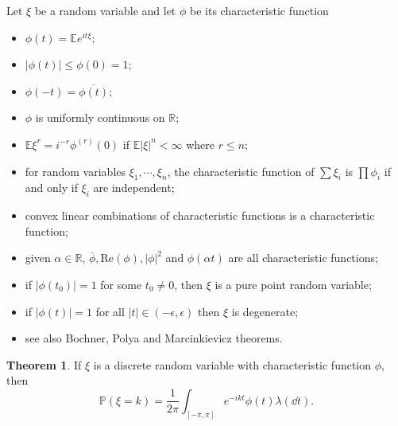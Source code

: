 \documentclass[]{article}
\theoremstyle{definition}
\newtheorem*{theorem}{Theorem}
\begin{document}
Let \(\xi\) be a random variable and let \(\phi\) be its characteristic function
\begin{itemize}
  \item \(\phi(t) =\mathbb{E}e^{it\xi}\);
  \item \(|\phi(t)| \le \phi(0) = 1\);
  \item \(\phi(-t) = \overline{\phi(t)}\);
  \item \(\phi\) is uniformly continuous on \(\mathbb{R}\);
  \item \(\mathbb{E}\xi^r = i^{-r}\phi^{(r)}(0)\) if \(\mathbb{E}|\xi|^n < \infty\) where \(r \le n\);
  \item for random variables \(\xi_1, \cdots, \xi_n\), the characteristic function of 
    \(\sum \xi_i\) is \(\prod \phi_i\) if and only if \(\xi_i\) are independent;
  \item convex linear combinations of characteristic functions is a characteristic function;
  \item given \(\alpha \in \mathbb{R}\), \(\overline{\phi}, \text{Re}(\phi), |\phi|^2\) and \(\phi(\alpha t)\) are all characteristic functions;
  \item if \(|\phi(t_0)| = 1\) for some \(t_0 \neq 0\), then \(\xi\) is a pure point random variable;
  \item if \(|\phi(t)| = 1\) for all \(|t| \in (-\epsilon, \epsilon)\) then \(\xi\) is degenerate;
  \item see also Bochner, Polya and Marcinkievicz theorems.
\end{itemize}

\begin{theorem}
  If \(\xi\) is a discrete random variable with characteristic function \(\phi\), then 
  \[\mathbb{P}(\xi = k) = \frac{1}{2\pi}\int_{[-\pi, \pi]} e^{-ikt}\phi(t) \lambda(\dd t).\]
\end{theorem}
\end{document}
